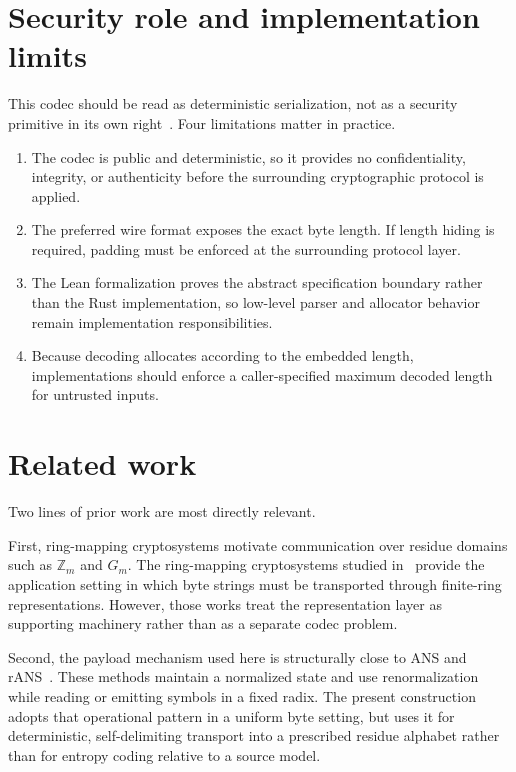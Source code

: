 \documentclass{system-security-article}
\newcommand{\Zm}{\ensuremath{\mathbb{Z}_m}}
\newcommand{\Gm}{\ensuremath{G_m}}
\begin{document}
    \section{Security role and implementation limits}
    \label{sec:limits}

    This codec should be read as deterministic serialization, not as a security primitive in its own right~\cite{shannon1949}.
    Four limitations matter in practice.
    \begin{enumerate}
        \item The codec is public and deterministic, so it provides no confidentiality,
        integrity, or authenticity before the surrounding cryptographic protocol is applied.
        \item The preferred wire format exposes the exact byte length.
        If length hiding is required, padding must be enforced at the surrounding protocol layer.
        \item The Lean formalization proves the abstract specification boundary rather than the Rust
        implementation, so low-level parser and allocator behavior remain implementation responsibilities.
        \item Because decoding allocates according to the embedded length, implementations should
        enforce a caller-specified maximum decoded length for untrusted inputs.
    \end{enumerate}

    \section{Related work}
    \label{sec:related}

    Two lines of prior work are most directly relevant.

    First, ring-mapping cryptosystems motivate communication over residue domains such as
    \(\Zm\) and \(\Gm\).
    The ring-mapping cryptosystems studied in~\cite{kryvyi2022symmetric,kryvyi2025symmetric}
    provide the application setting in which byte strings must be transported through finite-ring representations.
    However, those works treat the representation layer as supporting machinery rather than as a separate codec problem.

    Second, the payload mechanism used here is structurally close to ANS and rANS~\cite{duda2013ans,giesen2014rans}.
    These methods maintain a normalized state and use renormalization while reading or emitting symbols in a fixed radix.
    The present construction adopts that operational pattern in a uniform byte setting, but uses it for deterministic,
    self-delimiting transport into a prescribed residue alphabet rather than for entropy coding relative to a source model.
\end{document}

